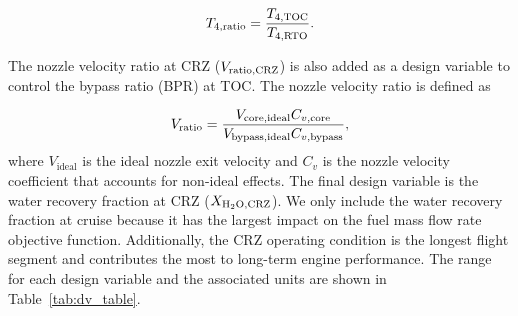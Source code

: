 \documentclass[conf]{new-aiaa}
\begin{document}
\begin{equation}
    T_{4,\rm{ratio}} = \frac{T_{4,\rm{TOC}}}{T_{4,\rm{RTO}}}.
    \label{eq:t4_ratio}
\end{equation}

\noindent
The nozzle velocity ratio at CRZ ($V_{\rm{ratio,CRZ}}$) is also added as a design variable to control the bypass ratio (BPR) at TOC.
The nozzle velocity ratio is defined as

\begin{equation}
    V_{\rm{ratio}} = \frac{V_{\rm{core,ideal}}C_{v,\rm{core}}}{V_{\rm{bypass,ideal}}C_{v,\rm{bypass}}},
    \label{eq:vratio}
\end{equation}
where $V_\text{ideal}$ is the ideal nozzle exit velocity and $C_v$ is the nozzle velocity coefficient that accounts for non-ideal effects.
The final design variable is the water recovery fraction at CRZ ($X_{\rm{H_2O,CRZ}}$).
We only include the water recovery fraction at cruise because it has the largest impact on the fuel mass flow rate objective function.
Additionally, the CRZ operating condition is the longest flight segment and contributes the most to long-term engine performance.
The range for each design variable and the associated units are shown in Table~\ref{tab:dv_table}.
\end{document}
